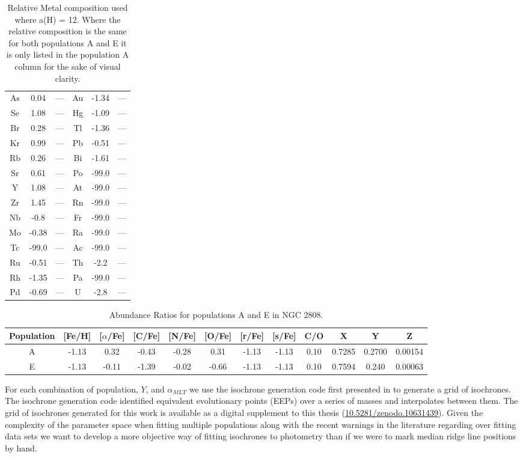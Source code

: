 \begin{table}
\begin{tabular}{c|cc||c|cc}
  As & 0.04 & --- & Au & -1.34 & --- \\
  Se & 1.08 & --- & Hg & -1.09 & --- \\
  Br & 0.28 & --- & Tl & -1.36 & --- \\
  Kr & 0.99 & --- & Pb & -0.51 & --- \\
  Rb & 0.26 & --- & Bi & -1.61 & --- \\
  Sr & 0.61 & --- & Po & -99.0 & --- \\
  Y & 1.08 & --- & At & -99.0 & --- \\
  Zr & 1.45 & --- & Rn & -99.0 & --- \\
  Nb & -0.8 & --- & Fr & -99.0 & --- \\
  Mo & -0.38 & --- & Ra & -99.0 & --- \\
  Tc & -99.0 & --- & Ac & -99.0 & --- \\
  Ru & -0.51 & --- & Th & -2.2 & --- \\
  Rh & -1.35 & --- & Pa & -99.0 & --- \\
  Pd & -0.69 & --- & U & -2.8 & --- \\
\end{tabular}
\caption{Relative Metal composition used where a(H) = 12. Where the relative
  composition is the same for both populations A and E it is only listed in
  the population A column for the sake of visual clarity.}
\label{tab:comp}
\end{table}

\begin{table}
  \small
\centering
\begin{tabular}{c|c c c c c c c c c c c}
  \hline
  Population & [Fe/H] & [$\alpha$/Fe] & [C/Fe] & [N/Fe] & [O/Fe] & [r/Fe] & [s/Fe] & C/O & X & Y & Z \\
  \hline
  \hline
  A & -1.13 & 0.32 & -0.43 & -0.28 & 0.31 & -1.13 & -1.13 & 0.10 & 0.7285 & 0.2700 & 0.00154 \\
  E & -1.13 & -0.11 & -1.39 & -0.02 & -0.66 & -1.13 & -1.13 & 0.10 & 0.7594 & 0.240 & 0.00063
\end{tabular}
\caption{Abundance Ratios for populations A and E in NGC 2808.}
\label{tab:simpleComp}
\end{table}

For each combination of population, $Y$, and $\alpha_{MLT}$ we use the
isochrone generation code first presented in \citet{Dotter2016} to generate a
grid of isochrones. The isochrone generation code identified equivalent
evolutionary points (EEPs) over a series of masses and interpolates between
them. The grid of isochrones generated for this work is available as a digital
supplement to this thesis
(\href{https://zenodo.org/records/10631439}{10.5281/zenodo.10631439}). Given
the complexity of the parameter space when fitting multiple populations along
with the recent warnings in the literature regarding over fitting data sets
\citep[e.g. ][]{Valle2022} we want to develop a more objective way of fitting
isochrones to photometry than if we were to mark median ridge line positions by
hand.

